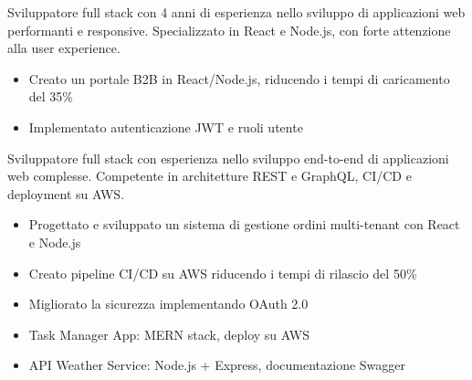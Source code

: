 \documentclass[10pt,a4paper]{altacv}
\begin{document}
\makecvheader

Sviluppatore full stack con 4 anni di esperienza nello sviluppo di applicazioni web performanti e responsive. Specializzato in React e Node.js, con forte attenzione alla user experience.

\begin{itemize}
\item Creato un portale B2B in React/Node.js, riducendo i tempi di caricamento del 35\%
\item Implementato autenticazione JWT e ruoli utente
\end{itemize}

       


\newpage


\makecvheader

Sviluppatore full stack con esperienza nello sviluppo end-to-end di applicazioni web complesse. Competente in architetture REST e GraphQL, CI/CD e deployment su AWS.

\begin{itemize}
\item Progettato e sviluppato un sistema di gestione ordini multi-tenant con React e Node.js
\item Creato pipeline CI/CD su AWS riducendo i tempi di rilascio del 50\%
\item Migliorato la sicurezza implementando OAuth 2.0
\end{itemize}

              

\begin{itemize}
  \item Task Manager App: MERN stack, deploy su AWS
  \item API Weather Service: Node.js + Express, documentazione Swagger
\end{itemize}
\end{document}
